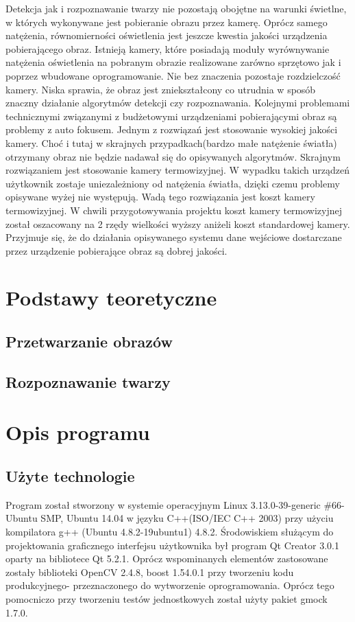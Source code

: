\documentclass[eng,printmode]{mgr}
\begin{document}
Detekcja jak i rozpoznawanie twarzy nie pozostają obojętne na warunki świetlne, w których wykonywane jest pobieranie obrazu przez kamerę. Oprócz samego natężenia, równomierności oświetlenia jest jeszcze kwestia jakości urządzenia pobierającego obraz. Istnieją kamery, które posiadają moduły wyrównywanie natężenia oświetlenia na pobranym obrazie realizowane zarówno sprzętowo jak i poprzez wbudowane oprogramowanie. Nie bez znaczenia pozostaje rozdzielczość kamery. Niska sprawia, że obraz jest zniekształcony co utrudnia w sposób znaczny działanie algorytmów detekcji czy rozpoznawania. Kolejnymi problemami technicznymi związanymi z budżetowymi urządzeniami pobierającymi obraz są problemy z auto fokusem. Jednym z rozwiązań jest stosowanie wysokiej jakości kamery. Choć i tutaj w skrajnych przypadkach(bardzo małe natężenie światła) otrzymany obraz nie będzie nadawał się do opisywanych algorytmów. Skrajnym rozwiązaniem jest stosowanie kamery termowizyjnej. W wypadku takich urządzeń użytkownik zostaje uniezależniony od natężenia światła, dzięki czemu problemy opisywane wyżej nie występują. Wadą tego rozwiązania jest koszt kamery termowizyjnej. W chwili przygotowywania projektu koszt kamery termowizyjnej został oszacowany na 2 rzędy wielkości wyższy aniżeli koszt standardowej kamery. Przyjmuje się, że do działania opisywanego systemu dane wejściowe dostarczane przez urządzenie pobierające obraz są dobrej jakości.
\chapter{Podstawy teoretyczne}


\section{Przetwarzanie obrazów}
\section{Rozpoznawanie twarzy}


\chapter{Opis programu}
\section{Użyte technologie}
Program został stworzony w systemie operacyjnym Linux 3.13.0-39-generic \#66-Ubuntu SMP, Ubuntu 14.04 w języku C++(ISO/IEC C++ 2003) przy użyciu kompilatora g++ (Ubuntu 4.8.2-19ubuntu1) 4.8.2. Środowiskiem służącym do projektowania graficznego interfejsu użytkownika był program Qt Creator 3.0.1 oparty na bibliotece Qt 5.2.1. Oprócz wspominanych elementów zastosowane zostały biblioteki OpenCV 2.4.8, boost 1.54.0.1 przy tworzeniu kodu produkcyjnego- przeznaczonego do wytworzenie oprogramowania. Oprócz tego pomocniczo przy tworzeniu testów jednostkowych został użyty pakiet gmock 1.7.0.
\end{document}
